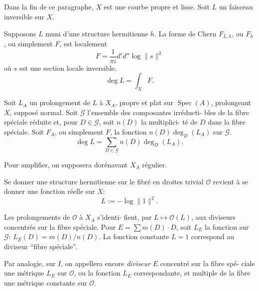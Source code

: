 \documentclass[12pt,a4paper]{article}
\theoremstyle{plain}
\theoremstyle{definition}
\DeclareMathOperator{\Spec}{Spec}
\newcommand{\Oo}{\mathscr{O}}
\begin{document}
\subsection{}

Dans la fin de ce paragraphe, $X$ est une courbe propre et lisse. Soit $L$ un
faisceau inversible sur $X$.

\smallskip

\begin{minipage}[t]{0.48\textwidth}
Supposons $L$ muni d'une structure
hermitienne $h$. La forme de Chern
$F_{L,h}$, ou $F_h$, ou simplement $F$, est
localement
\[
F = \frac{1}{\pi i} d'd'' \log \|s\|^2
\]
o\`u $s$ est une section locale
inversible.
\[
\deg L = \int_X F .
\]
\end{minipage}
\hfill
\begin{minipage}[t]{0.48\textwidth}
Soit $L_A$ un prolongement de $L$ \`a
$X_A$, propre et plat sur $\Spec(A)$,
prolongeant $X$, suppos\'e normal. Soit
$\mathcal{G}$ l'ensemble des composantes irr\'educti-
bles de la fibre sp\'eciale r\'eduite et,
pour $D \in \mathcal{G}$, soit $n(D)$ la multiplici-
t\'e de $D$ dans la fibre sp\'eciale. Soit
$F_A$, ou simplement $F$, la fonction
$n(D) \deg_D(L_A)$ sur $\mathcal{G}$.
\[
\deg L = \sum_{D \in \mathcal{G}} n(D) \deg_D(L_A) .
\]
\end{minipage}

\smallskip

Pour amplifier, on supposera dor\'enavant $X_A$ r\'egulier.

\medskip

\begin{minipage}[t]{0.48\textwidth}
Se donner une structure
hermitienne sur le fibr\'e
en droites trivial $\Oo$ revient
\`a se donner une fonction r\'eelle
sur $X$:
\[
L := -\log \|1\|^2 .
\]
\end{minipage}
\hfill
\begin{minipage}[t]{0.48\textwidth}
Les prolongements de $\Oo$ \`a $X_A$ s'identi-
fient, par $L \mapsto \Oo(L)$, aux diviseurs
concentr\'es sur la fibre sp\'eciale. Pour
$E = \sum m(D) \cdot D$, soit $L_E$ la fonction
sur $\mathcal{G}$: $L_E(D) = m(D)/n(D)$. La fonction
constante $L = 1$ correspond au diviseur
``fibre sp\'eciale''.
\end{minipage}

\smallskip

Par analogie, sur $I$, on appellera encore \emph{diviseur} $E$ concentr\'e sur la fibre sp\'e-
ciale une m\'etrique $L_E$ sur $\Oo$, ou la fonction $L_E$ correspondante, et multiple
de la fibre une m\'etrique constante sur $\Oo$.
\end{document}
